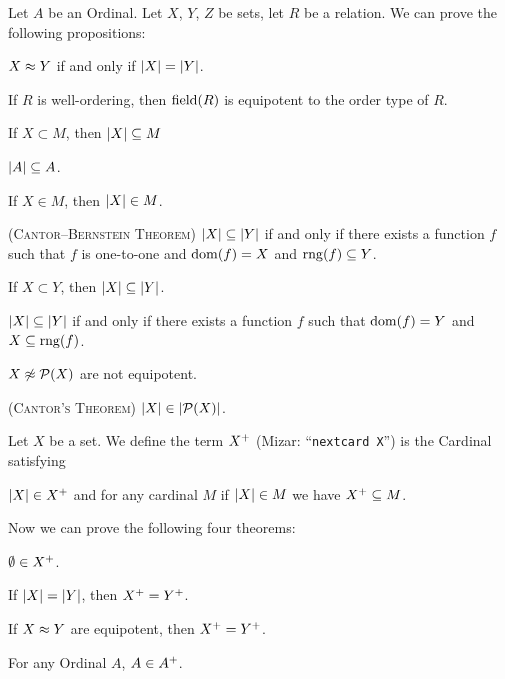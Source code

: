 \documentclass{article}
\begin{document}
Let $A$ be an Ordinal.
Let $X$, $Y$, $Z$ be sets, let $R$ be a relation. We can prove the
following propositions:
\begin{thm}
\item\label{card1:5} $X\approx Y$ if and only if $|X|=|Y|$.
\item\label{card1:6} If $R$ is well-ordering, then $\operatorname{field}(R)$ is
  equipotent to the order type of $R$.
\item\label{card1:7} If $X\subset M$, then $|X|\subseteq M$
\item\label{card1:8} $|A|\subseteq A$.
\item\label{card1:9} If $X\in M$, then $|X|\in M$.
\item\label{card1:10} (\textsc{Cantor--Bernstein Theorem})
  $|X|\subseteq|Y|$ if and only if there exists a function $f$
  such that $f$ is one-to-one and $\operatorname{dom}(f)=X$ and $\operatorname{rng}(f)\subseteq Y$.
\item\label{card1:11} If $X\subset Y$, then $|X|\subseteq|Y|$.
\item\label{card1:12} $|X|\subseteq|Y|$ if and only if there
  exists a function $f$ such that $\operatorname{dom}(f)=Y$ and $X\subseteq\operatorname{rng}(f)$.
\item\label{card1:13} $X\not\approx\mathcal{P}(X)$ are not equipotent.
\item\label{card1:14} (\textsc{Cantor's Theorem})
  $|X|\in|\mathcal{P}(X)|$.
\end{thm}

\begin{definition}
Let $X$ be a set.
We define the term $X^{+}$ (Mizar: ``\verb#nextcard X#'') is the
Cardinal satisfying
\begin{defn}
\item $|X|\in X^{+}$ and for any cardinal $M$ if $|X|\in M$
  we have $X^{+}\subseteq M$.
\end{defn}
\end{definition}

Now we can prove the following four theorems:
\begin{thm}
\item\label{card1:15} $\emptyset\in X^{+}$.
\item\label{card1:16} If $|X|=|Y|$, then $X^{+}=Y^{+}$.
\item\label{card1:17} If $X\approx Y$ are equipotent, then
  $X^{+}=Y^{+}$.
\item\label{card1:18} For any Ordinal $A$, $A\in A^{+}$.
\end{thm}
\end{document}
